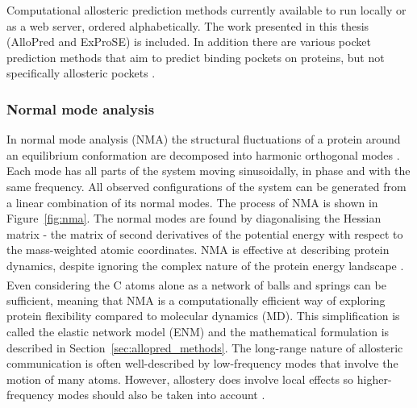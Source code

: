 \begin{table}
\caption[Computational allosteric prediction methods currently available to run locally or as a web server]
{Computational allosteric prediction methods currently available to run locally or as a web server, ordered alphabetically.
The work presented in this thesis (AlloPred and ExProSE) is included.
In addition there are various pocket prediction methods that aim to predict binding pockets on proteins, but not specifically allosteric pockets \cite{Huang2006, LeGuilloux2009, Cimermancic2016}.}

\label{tab:allosteric_methods}
\end{table}


\subsubsection{Normal mode analysis}

In normal mode analysis (NMA) the structural fluctuations of a protein around an equilibrium conformation are decomposed into harmonic orthogonal modes \cite{Hayward2008}.
Each mode has all parts of the system moving sinusoidally, in phase and with the same frequency.
All observed configurations of the system can be generated from a linear combination of its normal modes.
The process of NMA is shown in Figure~\ref{fig:nma}.
The normal modes are found by diagonalising the Hessian matrix - the matrix of second derivatives of the potential energy with respect to the mass-weighted atomic coordinates.
NMA is effective at describing protein dynamics, despite ignoring the complex nature of the protein energy landscape \cite{Bahar2005}.
Even considering the C\textsuperscript{\textalpha} atoms alone as a network of balls and springs can be sufficient, meaning that NMA is a computationally efficient way of exploring protein flexibility compared to molecular dynamics (MD).
This simplification is called the elastic network model (ENM) and the mathematical formulation is described in Section~\ref{sec:allopred_methods}.
The long-range nature of allosteric communication is often well-described by low-frequency modes that involve the motion of many atoms.
However, allostery does involve local effects so higher-frequency modes should also be taken into account \cite{Collier2013}.

